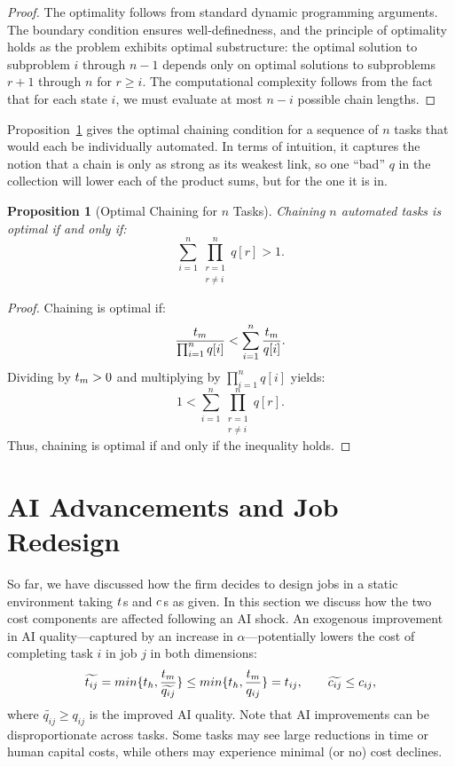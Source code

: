 \documentclass{article}
\theoremstyle{plain}
\theoremstyle{plain}
\newtheorem{proposition}[theorem]{Proposition}
\begin{document}
\begin{proof}
The optimality follows from standard dynamic programming arguments. The boundary condition ensures well-definedness, and the principle of optimality holds as the problem exhibits optimal substructure: the optimal solution to subproblem \(i\) through \(n-1\) depends only on optimal solutions to subproblems \(r+1\) through \(n\) for \(r \geq i\). The computational complexity follows from the fact that for each state \(i\), we must evaluate at most \(n-i\) possible chain lengths.
\end{proof}

Proposition~\ref{prop:optimal_chaining} gives the optimal chaining condition for a sequence of \(n\) tasks that would each be individually automated.
In terms of intuition, it captures the notion that a chain is only as strong as its weakest link, so one “bad” \(q\) in the collection will lower each of the product sums, but for the one it is in. 

\begin{proposition}[Optimal Chaining for \(n\) Tasks] \label{prop:optimal_chaining}
Chaining \(n\) automated tasks is optimal if and only if:
\[
\sum_{i=1}^n \prod_{\substack{r=1 \\ r \neq i}}^n q[r] > 1.
\]
\end{proposition}

\begin{proof}
Chaining is optimal if:
\[
\frac{t_{m}}{\prod_{i=1}^n q[i]} < \sum_{i=1}^n \frac{t_{m}}{q[i]}.
\]
Dividing by \(t_{m} > 0\) and multiplying by \(\prod_{i=1}^n q[i]\) yields:
\[
1 < \sum_{i=1}^n \prod_{\substack{r=1 \\ r \neq i}}^n q[r].
\]
Thus, chaining is optimal if and only if the inequality holds.
\end{proof}




\section{AI Advancements and Job Redesign}
\label{sec:job_redesign}

So far, we have discussed how the firm decides to design jobs in a static environment taking $t_{}$s and $c_{}$s as given.
In this section we discuss how the two cost components are affected following an AI shock.
An exogenous improvement in AI quality---captured by an increase in $\alpha$---potentially lowers the cost of completing task $i$ in job $j$ in both dimensions:
\[
\widetilde{t_{ij}} = min\{t_{h}{}, \frac{t_{m}{}}{\widetilde{q_{ij}}}\} \le min\{t_{h}{}, \frac{t_{m}{}}{q_{ij}}\} = t_{ij},
\qquad
\widetilde{c_{ij}} \le c_{ij},
\]
where $\widetilde{q_{ij}} \geq q_{ij}$ is the improved AI quality. 
Note that AI improvements can be disproportionate across tasks.  
Some tasks may see large reductions in time or human capital costs, while others may experience minimal (or no) cost declines.  
\end{document}
